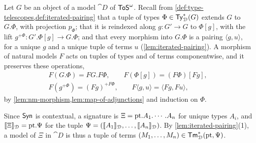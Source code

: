 Let $G$ be an object of a model $\cat{D}$ of $\mathsf{ToS}^{\omega}$. Recall from \cref{def:type-telescopes,def:iterated-pairing} that a tuple of types $\Phi \in \mathsf{Ty}^*_{\mathcal{D}}(G)$ extends $G$ to $G.\Phi$, with projection $p_\Phi$; that it is reindexed along $g : G' \to G$ to $\Phi[g]$, with the lift $g^{+\Phi} : G'.\Phi[g] \to G.\Phi$; and that every morphism into $G.\Phi$ is a pairing $\langle g, u \rangle$, for a unique $g$ and a unique tuple of terms $u$ (\cref{lem:iterated-pairing}). A morphism of natural models $F$ acts on tuples of types and of terms componentwise, and it preserves these operations,
\begin{gather*}
    F(G.\Phi) = FG.F\Phi, \qquad F(\Phi[g]) = (F\Phi)[Fg],\\
    F(g^{+\Phi}) = (Fg)^{+F\Phi}, \qquad F\langle g, u \rangle = \langle Fg, Fu \rangle,
\end{gather*}
by \cref{lem:nm-morphism,lem:map-of-adjunctions} and induction on $\Phi$.

Since $\mathsf{Syn}$ is contextual, a signature is $\Xi = \mathrm{pt}.A_1.\cdots.A_n$ for unique types $A_i$, and $\llbracket\Xi\rrbracket_{\mathcal{D}} = \mathrm{pt}.\Psi$ for the tuple $\Psi = (\llbracket A_1\rrbracket_{\mathcal{D}}, \ldots, \llbracket A_n\rrbracket_{\mathcal{D}})$. By \cref{lem:iterated-pairing}(1), a model of $\Xi$ in $\cat{D}$ is thus a tuple of terms $(M_1, \ldots, M_n) \in \mathsf{Tm}^*_{\mathcal{D}}(\mathrm{pt}, \Psi)$.

